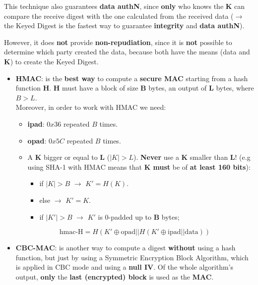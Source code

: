 \noindent
This technique also guarantees \textbf{data authN}, since \textbf{only} who knows the \textbf{K} can compare the receive digest with the one calculated from the received data (\(\rightarrow \) the Keyed Digest is the fastest way to guarantee \textbf{integrity} and \textbf{data authN}).
\vspace{-0.5cm}
\begin{center}
    \begin{quotebox-red}{}
        However, it does \textbf{not} provide \textbf{non-repudiation}, since it is \textbf{not} possible to determine which
        party created the data, because both have the means (data and \textbf{K}) to create the Keyed Digest.
    \end{quotebox-red}   
\end{center}
\begin{itemize}
    \item \textbf{HMAC}: is the \textbf{best way} to compute a \textbf{secure MAC} starting from a hash function \textbf{H}.
    \textbf{H} must have a block of size \textbf{B} bytes, an output of \textbf{L} bytes, where \(B > L\).\\ Moreover, in order to work with HMAC we need:
    \begin{itemize}
        \item \textbf{ipad}: \(0x36\) repeated \(B\) times.
        \item \textbf{opad}: \(0x5C\) repeated \(B\) times.
        \item A \textbf{K} bigger or equal to \textbf{L} (\( |K| > L \)). \textbf{Never} use a \textbf{K} smaller than \textbf{L}! (e.g using SHA-1 with HMAC means that \textbf{K must} be of \textbf{at least 160 bits}):
        \begin{itemize}
            \item if \(|K| > B\) \(\rightarrow \) \(K'=H(K)\).
            \item else \(\rightarrow \) \(K'=K\).
            \item if \(|K'|>B\) \(\rightarrow \) \(K'\) is 0-padded up to \textbf{B} bytes; 
        \end{itemize}
    \end{itemize}
    \[
        \text{hmac-H} = H\left( K' \oplus \text{opad} || H(K' \oplus \text{ipad} || \text{data}) \right)
        \]
    \item \textbf{CBC-MAC}: is another way to compute a digest \textbf{without} using a hash function, but just by using a Symmetric Encryption Block Algorithm, which is applied in CBC mode and using a \textbf{null IV}. Of the whole algorithm's output, \textbf{only} the \textbf{last (encrypted) block} is used as the \textbf{MAC}.
    \\ 
    \begin{customquote}
    \vspace{-0.4cm}

\end{customquote}
\end{itemize}
